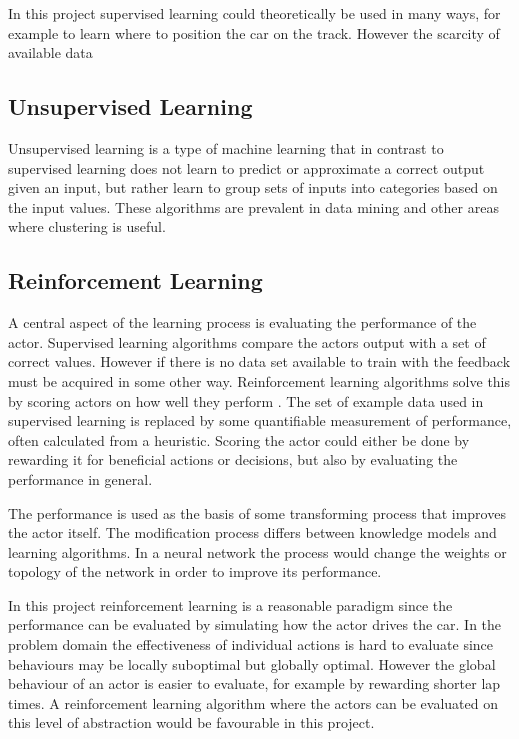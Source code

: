 In this project supervised learning could theoretically be used in many ways, for example to learn where to position the car on the track. However the scarcity of available data 

\subsection{Unsupervised Learning}
Unsupervised learning is a type of machine learning that in contrast to supervised learning does not learn to predict or approximate a correct output given an input, but rather learn to group sets of inputs into categories based on the input values. These algorithms are prevalent in data mining and other areas where clustering is useful. 


\subsection{Reinforcement Learning}
A central aspect of the learning process is evaluating the performance of the actor. Supervised learning algorithms compare the actors output with a set of correct values. However if there is no data set available to train with the feedback must be acquired in some other way. Reinforcement learning algorithms solve this by scoring actors on how well they perform \cite{whiteson}. The set of example data used in supervised learning is replaced by some quantifiable measurement of performance, often calculated from a heuristic. Scoring the actor could either be done by rewarding it for beneficial actions or decisions, but also by evaluating the performance in general. 

The performance is used as the basis of some transforming process that improves the actor itself. The modification process differs between knowledge models and learning algorithms. In a neural network the process would change the weights or topology of the network in order to improve its performance.

In this project reinforcement learning is a reasonable paradigm since the performance can be evaluated by simulating how the actor drives the car. In the problem domain the effectiveness of individual actions is hard to evaluate since behaviours may be locally suboptimal but globally optimal. However the global behaviour of an actor is easier to evaluate, for example by rewarding shorter lap times. A reinforcement learning algorithm where the actors can be evaluated on this level of abstraction would be favourable in this project.   

